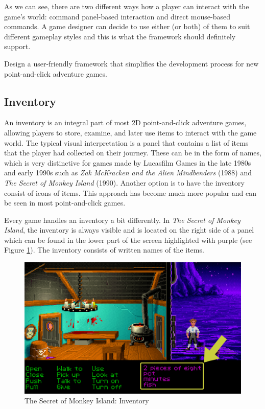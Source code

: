 As we can see, there are two different ways how a player can interact with the game's world: command panel-based interaction and direct mouse-based commands. A game designer can decide to use either (or both) of them to suit different gameplay styles and this is what the framework should definitely support.

Design a user-friendly framework that simplifies the development process for new point-and-click adventure games.


\subsection{Inventory}
\label{sec:Inventory}
An inventory is an integral part of most 2D point-and-click adventure games, allowing players to store, examine, and later use items to interact with the game world. The typical visual interpretation is a panel that contains a list of items that the player had collected on their journey. These can be in the form of names, which is very distinctive for games made by Lucasfilm Games in the late 1980s and early 1990s such as \textit{Zak McKracken and the Alien Mindbenders} (1988) and \textit{The Secret of Monkey Island} (1990). Another option is to have the inventory consist of icons of items. This approach has become much more popular and can be seen in most point-and-click games.

Every game handles an inventory a bit differently. In \textit{The Secret of Monkey Island}, the inventory is always visible and is located on the right side of a panel which can be found in the lower part of the screen highlighted with purple (see Figure \ref{fig:I-TSoMI}). The inventory consists of written names of the items. 

\begin{figure}[H]
\centering
\includegraphics[width=.8\linewidth]{img/I-TSoMI.png}
\caption{The Secret of Monkey Island: Inventory}
\label{fig:I-TSoMI}
\end{figure}

